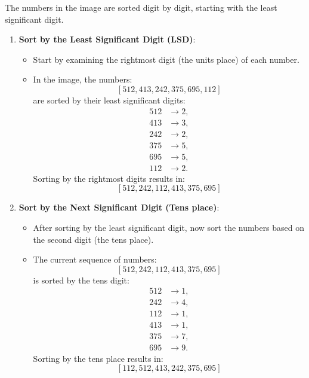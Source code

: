 \begin{example}
    The numbers in the image are sorted digit by digit, starting with the least significant digit. 

    \begin{enumerate}
        \item \textbf{Sort by the Least Significant Digit (LSD)}:
        \begin{itemize}
            \item Start by examining the rightmost digit (the units place) of each number.
            \item In the image, the numbers:
            \[
            [512, 413, 242, 375, 695, 112]
            \]
            are sorted by their least significant digits:
            \begin{align*}
            512 & \rightarrow 2, \\
            413 & \rightarrow 3, \\
            242 & \rightarrow 2, \\
            375 & \rightarrow 5, \\
            695 & \rightarrow 5, \\
            112 & \rightarrow 2.
            \end{align*}
            Sorting by the rightmost digits results in:
            \[
            [512, 242, 112, 413, 375, 695]
            \]
        \end{itemize}
        
        \item \textbf{Sort by the Next Significant Digit (Tens place)}:
        \begin{itemize}
            \item After sorting by the least significant digit, now sort the numbers based on the second digit (the tens place).
            \item The current sequence of numbers:
            \[
            [512, 242, 112, 413, 375, 695]
            \]
            is sorted by the tens digit:
            \begin{align*}
            512 & \rightarrow 1, \\
            242 & \rightarrow 4, \\
            112 & \rightarrow 1, \\
            413 & \rightarrow 1, \\
            375 & \rightarrow 7, \\
            695 & \rightarrow 9.
            \end{align*}
            Sorting by the tens place results in:
            \[
            [112, 512, 413, 242, 375, 695]
            \]
        \end{itemize}
        

\end{enumerate}
\end{example}
